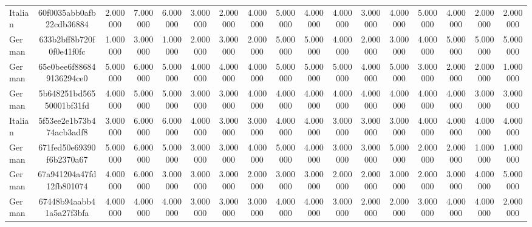 \begin{table}[htbp]
\begin{tabular}{lcccccccccccccccc}
Italian & 60f0035abb0afb22cdb36884 & 2.000000 & 7.000000 & 6.000000 & 3.000000 & 2.000000 & 4.000000 & 5.000000 & 4.000000 & 4.000000 & 3.000000 & 4.000000 & 5.000000 & 4.000000 & 2.000000 & 2.000000 \\
German & 633b2bff8b720f0f0e41f0fc & 1.000000 & 3.000000 & 1.000000 & 2.000000 & 3.000000 & 2.000000 & 5.000000 & 5.000000 & 4.000000 & 2.000000 & 3.000000 & 4.000000 & 5.000000 & 5.000000 & 5.000000 \\
German & 65e0bee6f886849136294ce0 & 5.000000 & 6.000000 & 5.000000 & 4.000000 & 4.000000 & 4.000000 & 5.000000 & 5.000000 & 5.000000 & 4.000000 & 5.000000 & 3.000000 & 2.000000 & 2.000000 & 1.000000 \\
German & 5b648251bd56550001bf31fd & 4.000000 & 5.000000 & 5.000000 & 3.000000 & 3.000000 & 4.000000 & 4.000000 & 4.000000 & 4.000000 & 4.000000 & 4.000000 & 4.000000 & 4.000000 & 3.000000 & 3.000000 \\
Italian & 5f53ee2e1b73b474acb3adf8 & 3.000000 & 6.000000 & 6.000000 & 4.000000 & 3.000000 & 3.000000 & 4.000000 & 4.000000 & 3.000000 & 3.000000 & 3.000000 & 4.000000 & 4.000000 & 4.000000 & 4.000000 \\
German & 671fed50e69390f6b2370a67 & 5.000000 & 6.000000 & 5.000000 & 3.000000 & 3.000000 & 4.000000 & 5.000000 & 4.000000 & 3.000000 & 3.000000 & 5.000000 & 2.000000 & 2.000000 & 1.000000 & 1.000000 \\
German & 67a941204a47fd12fb801074 & 4.000000 & 6.000000 & 3.000000 & 3.000000 & 3.000000 & 2.000000 & 3.000000 & 3.000000 & 2.000000 & 2.000000 & 3.000000 & 2.000000 & 3.000000 & 4.000000 & 5.000000 \\
German & 67448b94aabb41a5a27f3bfa & 4.000000 & 4.000000 & 4.000000 & 3.000000 & 3.000000 & 3.000000 & 4.000000 & 4.000000 & 3.000000 & 2.000000 & 2.000000 & 3.000000 & 4.000000 & 4.000000 & 2.000000 \\
\bottomrule
\end{tabular}
\end{table}
